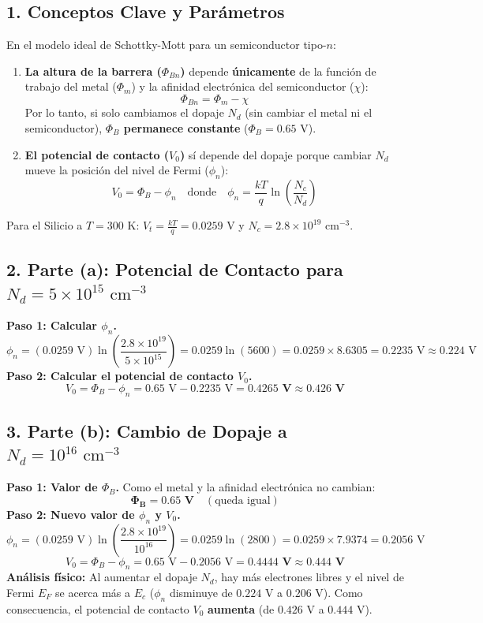 \documentclass[11pt,a4paper]{article}
\begin{document}
\subsection*{1. Conceptos Clave y Parámetros}
En el modelo ideal de Schottky-Mott para un semiconductor tipo-$n$:
\begin{enumerate}
    \item \textbf{La altura de la barrera ($\Phi_{Bn}$)} depende \textbf{únicamente} de la función de trabajo del metal ($\Phi_m$) y la afinidad electrónica del semiconductor ($\chi$):
    \[
    \Phi_{Bn} = \Phi_m - \chi
    \]
    Por lo tanto, si solo cambiamos el dopaje $N_d$ (sin cambiar el metal ni el semiconductor), \textbf{$\Phi_B$ permanece constante} ($\Phi_B = 0.65\text{ V}$).
    \item \textbf{El potencial de contacto ($V_0$)} sí depende del dopaje porque cambiar $N_d$ mueve la posición del nivel de Fermi ($\phi_n$):
    \[
    V_0 = \Phi_B - \phi_n \quad \text{donde} \quad \phi_n = \frac{kT}{q}\ln\left(\frac{N_c}{N_d}\right)
    \]
\end{enumerate}
Para el Silicio a $T = 300\text{ K}$: $V_t = \frac{kT}{q} = 0.0259\text{ V}$ y $N_c = 2.8 \times 10^{19}\text{ cm}^{-3}$.

\subsection*{2. Parte (a): Potencial de Contacto para $N_d = 5 \times 10^{15}\text{ cm}^{-3}$}
\textbf{Paso 1: Calcular $\phi_n$.}
\[
\phi_n = (0.0259\text{ V}) \ln\left(\frac{2.8 \times 10^{19}}{5 \times 10^{15}}\right) = 0.0259 \ln(5600) = 0.0259 \times 8.6305 = 0.2235\text{ V} \approx 0.224\text{ V}
\]
\textbf{Paso 2: Calcular el potencial de contacto $V_0$.}
\[
V_0 = \Phi_B - \phi_n = 0.65\text{ V} - 0.2235\text{ V} = \mathbf{0.4265\text{ V} \approx 0.426\text{ V}}
\]

\subsection*{3. Parte (b): Cambio de Dopaje a $N_d = 10^{16}\text{ cm}^{-3}$}
\textbf{Paso 1: Valor de $\Phi_B$.}
Como el metal y la afinidad electrónica no cambian:
\[
\mathbf{\Phi_B = 0.65\text{ V}} \quad (\text{queda igual})
\]
\textbf{Paso 2: Nuevo valor de $\phi_n$ y $V_0$.}
\[
\phi_n = (0.0259\text{ V}) \ln\left(\frac{2.8 \times 10^{19}}{10^{16}}\right) = 0.0259 \ln(2800) = 0.0259 \times 7.9374 = 0.2056\text{ V}
\]
\[
V_0 = \Phi_B - \phi_n = 0.65\text{ V} - 0.2056\text{ V} = \mathbf{0.4444\text{ V} \approx 0.444\text{ V}}
\]
\textbf{Análisis físico:} Al aumentar el dopaje $N_d$, hay más electrones libres y el nivel de Fermi $E_F$ se acerca más a $E_c$ ($\phi_n$ disminuye de $0.224\text{ V}$ a $0.206\text{ V}$). Como consecuencia, el potencial de contacto $V_0$ \textbf{aumenta} (de $0.426\text{ V}$ a $0.444\text{ V}$).
\end{document}

